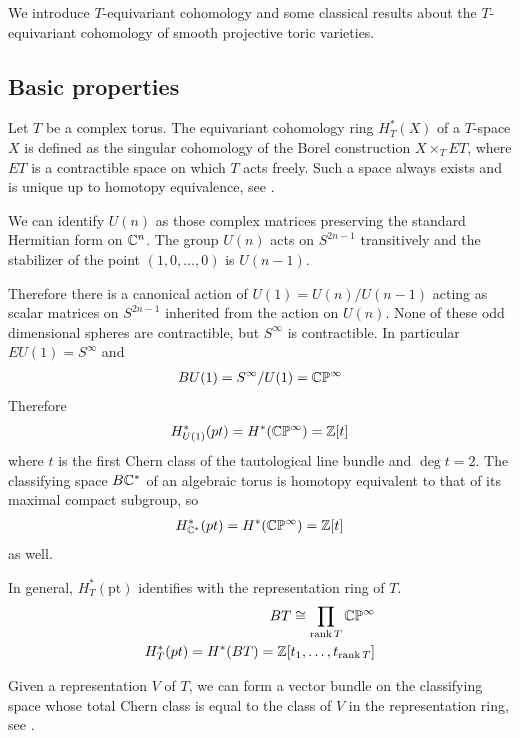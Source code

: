 We introduce $T$-equivariant cohomology and some classical results about the
$T$-equivariant cohomology of smooth projective toric varieties.

\subsection{Basic properties}
Let $T$ be a complex torus. The equivariant cohomology ring $H_T^*(X)$ of a $T$-space $X$ is
defined as the singular cohomology of the Borel construction $X\times_T ET$,
where $ET$ is a contractible space on which $T$ acts freely. Such a space
always exists and is unique up to homotopy equivalence, see \cite{hatcher}.

\begin{example}
	We can identify $U(n)$ as those complex matrices preserving
	the standard Hermitian form on $\mathbb{C}^n$. The group $U(n)$ acts on $S^{2n-1}$ transitively and the stabilizer of the point $(1,0,\ldots,0)$ is $U(n-1)$.

	Therefore there is a canonical action of $U(1) = U(n)/U(n-1)$ acting as scalar matrices on $S^{2n-1}$ inherited from the action on $U(n)$. None of these odd dimensional spheres are contractible, but $S^\infty$ is contractible. In particular $EU(1) = S^\infty$ and \begin{align*}
		BU(1) = S^\infty/U(1) = \mathbb{C}\mathbb{P}^\infty
	\end{align*}
	Therefore \begin{align*}
		H^*_{U(1)}(pt) = H^*(\mathbb{C}\mathbb{P}^\infty) = \mathbb{Z}[t]
	\end{align*} where $t$ is the first Chern class of the tautological line bundle and $\deg t = 2$. The classifying space $B\mathbb{C}^*$ of an algebraic torus is
	homotopy equivalent to that of its maximal compact subgroup, so \begin{align*}
		H^*_{\mathbb{C}^*}(pt) = H^*(\mathbb{C}\mathbb{P}^\infty) = \mathbb{Z}[t]
	\end{align*} as well.
\end{example}

\begin{example}
	In general, $H_T^*(\text{pt})$ identifies with the representation ring of $T$. \begin{align*}
		BT \cong \prod_{\operatorname{rank} T} \mathbb{C}\mathbb{P}^\infty \\
		H_T^*(pt) = H^*(BT) = \mathbb{Z}[t_1,\ldots,t_{\operatorname{rank} T}]
	\end{align*}

	Given a representation $V$ of $T$,
	we can form a vector bundle on the classifying space whose
	total Chern class is equal to the class of $V$ in the representation ring, see \cite{huybrechts}.
\end{example}

